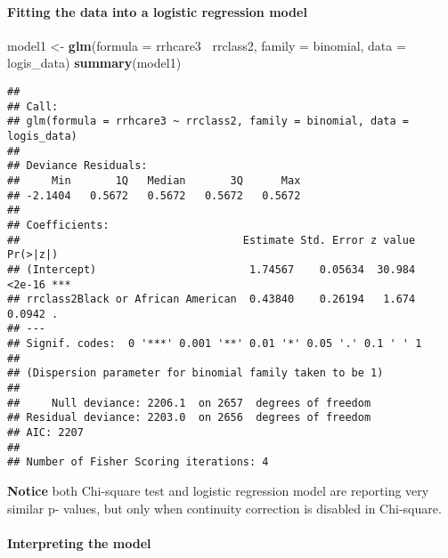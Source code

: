 \documentclass[]{article}
\newenvironment{Shaded}{\begin{snugshade}}{\end{snugshade}}
\newcommand{\DataTypeTok}[1]{\textcolor[rgb]{0.13,0.29,0.53}{#1}}
\newcommand{\KeywordTok}[1]{\textcolor[rgb]{0.13,0.29,0.53}{\textbf{#1}}}
\newcommand{\NormalTok}[1]{#1}
\newcommand{\OperatorTok}[1]{\textcolor[rgb]{0.81,0.36,0.00}{\textbf{#1}}}
\newcommand{\StringTok}[1]{\textcolor[rgb]{0.31,0.60,0.02}{#1}}
\let\oldparagraph\paragraph
\renewcommand{\paragraph}[1]{\oldparagraph{#1}\mbox{}}
\begin{document}
\hypertarget{fitting-the-data-into-a-logistic-regression-model}{%
\paragraph{Fitting the data into a logistic regression
model}\label{fitting-the-data-into-a-logistic-regression-model}}

\begin{Shaded}
\begin{Highlighting}[]
\NormalTok{model1 <-}\StringTok{ }\KeywordTok{glm}\NormalTok{(}\DataTypeTok{formula =}\NormalTok{ rrhcare3}\OperatorTok{~}\StringTok{ }\NormalTok{rrclass2, }\DataTypeTok{family =}\NormalTok{ binomial, }\DataTypeTok{data =}\NormalTok{ logis_data)}
\KeywordTok{summary}\NormalTok{(model1)}
\end{Highlighting}
\end{Shaded}

\begin{verbatim}
## 
## Call:
## glm(formula = rrhcare3 ~ rrclass2, family = binomial, data = logis_data)
## 
## Deviance Residuals: 
##     Min       1Q   Median       3Q      Max  
## -2.1404   0.5672   0.5672   0.5672   0.5672  
## 
## Coefficients:
##                                   Estimate Std. Error z value Pr(>|z|)    
## (Intercept)                        1.74567    0.05634  30.984   <2e-16 ***
## rrclass2Black or African American  0.43840    0.26194   1.674   0.0942 .  
## ---
## Signif. codes:  0 '***' 0.001 '**' 0.01 '*' 0.05 '.' 0.1 ' ' 1
## 
## (Dispersion parameter for binomial family taken to be 1)
## 
##     Null deviance: 2206.1  on 2657  degrees of freedom
## Residual deviance: 2203.0  on 2656  degrees of freedom
## AIC: 2207
## 
## Number of Fisher Scoring iterations: 4
\end{verbatim}

\textbf{Notice} both Chi-square test and logistic regression model are
reporting very similar p- values, but only when continuity correction is
disabled in Chi-square.

\hypertarget{interpreting-the-model}{%
\paragraph{Interpreting the model}\label{interpreting-the-model}}

\begin{Shaded}
\end{Shaded}
\end{document}
